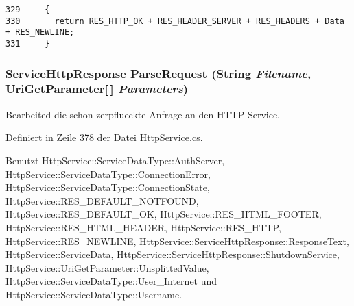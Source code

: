 \footnotesize\begin{verbatim}329     {
330       return RES_HTTP_OK + RES_HEADER_SERVER + RES_HEADERS + Data + RES_NEWLINE;
331     }
\end{verbatim}\normalsize 
\hypertarget{classQbeSAS_1_1HttpService_QbeSAS_1_1HttpServiced8}{
\subsubsection[ParseRequest]{\setlength{\rightskip}{0pt plus 5cm}\hyperlink{classQbeSAS_1_1HttpService_1_1ServiceHttpResponse}{Service\-Http\-Response} Parse\-Request (String {\em Filename}, \hyperlink{classQbeSAS_1_1HttpService_1_1UriGetParameter}{Uri\-Get\-Parameter}\mbox{[}$\,$\mbox{]} {\em Parameters})}}
\label{classQbeSAS_1_1HttpService_QbeSAS_1_1HttpServiced8}


Bearbeited die schon zerpflueckte Anfrage an den HTTP Service. 



Definiert in Zeile 378 der Datei Http\-Service.cs.

Benutzt Http\-Service::Service\-Data\-Type::Auth\-Server, Http\-Service::Service\-Data\-Type::Connection\-Error, Http\-Service::Service\-Data\-Type::Connection\-State, Http\-Service::RES\_\-DEFAULT\_\-NOTFOUND, Http\-Service::RES\_\-DEFAULT\_\-OK, Http\-Service::RES\_\-HTML\_\-FOOTER, Http\-Service::RES\_\-HTML\_\-HEADER, Http\-Service::RES\_\-HTTP, Http\-Service::RES\_\-NEWLINE, Http\-Service::Service\-Http\-Response::Response\-Text, Http\-Service::Service\-Data, Http\-Service::Service\-Http\-Response::Shutdown\-Service, Http\-Service::Uri\-Get\-Parameter::Unsplitted\-Value, Http\-Service::Service\-Data\-Type::User\_\-Internet und Http\-Service::Service\-Data\-Type::Username.



